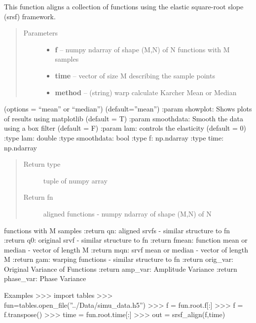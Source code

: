 \documentclass[letterpaper,10pt,english]{sphinxmanual}
\begin{document}

\begin{fulllineitems}
\label{time_warping:time_warping.srsf_align}
This function aligns a collection of functions using the elastic
square-root slope (srsf) framework.
\begin{quote}\begin{description}
\item[{Parameters}] \leavevmode\begin{itemize}
\item {} 
\textbf{f} -- numpy ndarray of shape (M,N) of N functions with M samples

\item {} 
\textbf{time} -- vector of size M describing the sample points

\item {} 
\textbf{method} -- (string) warp calculate Karcher Mean or Median

\end{itemize}

\end{description}\end{quote}

(options = ``mean'' or ``median'') (default=''mean'')
:param showplot: Shows plots of results using matplotlib (default = T)
:param smoothdata: Smooth the data using a box filter (default = F)
:param lam: controls the elasticity (default = 0)
:type lam: double
:type smoothdata: bool
:type f: np.ndarray
:type time: np.ndarray
\begin{quote}\begin{description}
\item[{Return type}] \leavevmode
tuple of numpy array

\item[{Return fn}] \leavevmode
aligned functions - numpy ndarray of shape (M,N) of N

\end{description}\end{quote}

functions with M samples
:return qn: aligned srvfs - similar structure to fn
:return q0: original srvf - similar structure to fn
:return fmean: function mean or median - vector of length M
:return mqn: srvf mean or median - vector of length M
:return gam: warping functions - similar structure to fn
:return orig\_var: Original Variance of Functions
:return amp\_var: Amplitude Variance
:return phase\_var: Phase Variance

Examples
\textgreater{}\textgreater{}\textgreater{} import tables
\textgreater{}\textgreater{}\textgreater{} fun=tables.open\_file(''../Data/simu\_data.h5'')
\textgreater{}\textgreater{}\textgreater{} f = fun.root.f{[}:{]}
\textgreater{}\textgreater{}\textgreater{} f = f.transpose()
\textgreater{}\textgreater{}\textgreater{} time = fun.root.time{[}:{]}
\textgreater{}\textgreater{}\textgreater{} out = srsf\_align(f,time)

\end{fulllineitems}
\end{document}

